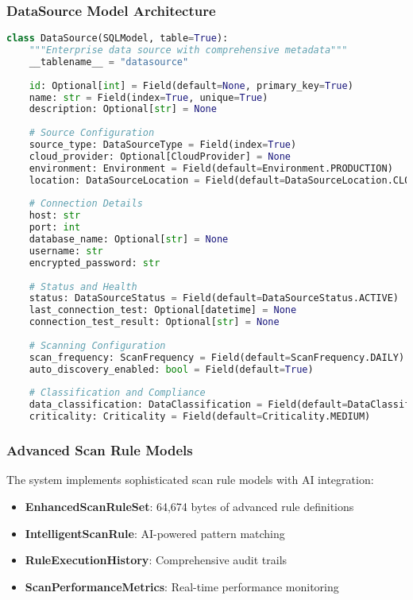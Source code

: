 \subsubsection{DataSource Model Architecture}
\begin{lstlisting}[language=Python, caption=DataSource Model Structure]
class DataSource(SQLModel, table=True):
    """Enterprise data source with comprehensive metadata"""
    __tablename__ = "datasource"
    
    id: Optional[int] = Field(default=None, primary_key=True)
    name: str = Field(index=True, unique=True)
    description: Optional[str] = None
    
    # Source Configuration
    source_type: DataSourceType = Field(index=True)
    cloud_provider: Optional[CloudProvider] = None
    environment: Environment = Field(default=Environment.PRODUCTION)
    location: DataSourceLocation = Field(default=DataSourceLocation.CLOUD)
    
    # Connection Details
    host: str
    port: int
    database_name: Optional[str] = None
    username: str
    encrypted_password: str
    
    # Status and Health
    status: DataSourceStatus = Field(default=DataSourceStatus.ACTIVE)
    last_connection_test: Optional[datetime] = None
    connection_test_result: Optional[str] = None
    
    # Scanning Configuration
    scan_frequency: ScanFrequency = Field(default=ScanFrequency.DAILY)
    auto_discovery_enabled: bool = Field(default=True)
    
    # Classification and Compliance
    data_classification: DataClassification = Field(default=DataClassification.INTERNAL)
    criticality: Criticality = Field(default=Criticality.MEDIUM)
\end{lstlisting}

\subsubsection{Advanced Scan Rule Models}

The system implements sophisticated scan rule models with AI integration:

\begin{itemize}
    \item \textbf{EnhancedScanRuleSet}: 64,674 bytes of advanced rule definitions
    \item \textbf{IntelligentScanRule}: AI-powered pattern matching
    \item \textbf{RuleExecutionHistory}: Comprehensive audit trails
    \item \textbf{ScanPerformanceMetrics}: Real-time performance monitoring
\end{itemize}

